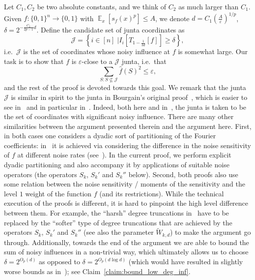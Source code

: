 \documentclass[10pt]{article}
\newcommand{\sett}[2]{\left\{\left. #1\;\right\vert #2\right\}}
\newcommand{\Expect}[2]{{\mathop{\mathbb E}_{#1}\left[#2\right]}}
\newcommand{\eps}{\varepsilon}
\begin{document}
Let $C_1, C_2$ be two absolute constants, and we think of $C_2$ as much larger than $C_1$. Given $f\colon\{0,1\}^n\to\{0,1\}$ with
$\Expect{x}{s_f(x)^p}\leq A$, we denote $d = C_1\left(\frac{A}{\eps}\right)^{1/p}$, $\delta = 2^{-\frac{C_2}{2p-1} d}$.
Define the candidate set of junta coordinates as
\[
\mathcal{J} = \sett{i\in [n]}{I_i[T_{1-\frac{1}{3d}}[f]]\geq \delta},
\]
i.e.~$\mathcal{J}$ is the set of coordinates whose noisy influence at $f$ is somewhat large. Our task is to show that $f$ is $\eps$-close to a $\mathcal{J}$ junta,
i.e.~that
\begin{equation}\label{eq6}
\sum\limits_{S: S\not\subseteq \mathcal{J}}\widehat{f}(S)^2\leq \eps,
\end{equation}
and the rest of the proof is devoted towards this goal. We remark that the junta $\mathcal{J}$ is
similar in spirit to the junta in Bourgain’s original proof~\cite{Bourgain}, which is easier to see in~\cite[Section 4]{kindler2018gaussian} and
in particular in~\cite[Theorem 4.20]{kindler2018gaussian}. Indeed, both here and in~\cite[Section 4]{kindler2018gaussian}, the junta is
taken to be the set of coordinates with significant noisy influence. There are many other similarities between the argument
presented therein and the argument here. First, in both cases one considers a dyadic sort of partitioning of the Fourier coefficients:
in~\cite[Section 4]{kindler2018gaussian} it is achieved via considering the difference in the noise sensitivity of $f$ at different
noise rates (see~\cite[Theorem 4.16]{kindler2018gaussian}). In the current proof, we perform explicit dyadic partitioning and also
accompany it by applications of suitable noise operators (the operators $S_k$, $S_k'$ and $S_k''$ below). Second, both proofs also use some relation between the noise sensitivity / moments
of the sensitivity and the level $1$ weight of the function $f$ (and its restrictions). While the technical execution of the proofs is
different, it is hard to pinpoint the high level difference between them.
For example, the ``harsh'' degree truncations
in~\cite{kindler2018gaussian} have to be replaced by the ``softer'' type of degree truncations that are achieved by the operators $S_k$, $S_k'$ and
$S_k''$ (see also the parameter $\tilde{W}_{k,d}$) to make the argument go through. Additionally, towards the end of the argument we are able to bound the sum of noisy influences in a non-trivial way, which ultimately allows us to choose $\delta = 2^{O_p(d)}$ as opposed to
$\delta = 2^{O_{p}(d\log d)}$ (which would have resulted in slightly worse bounds as in~\cite[Theorem 4.20]{kindler2018gaussian}); see Claim~\ref{claim:bound_low_deg_inf}.
\end{document}
